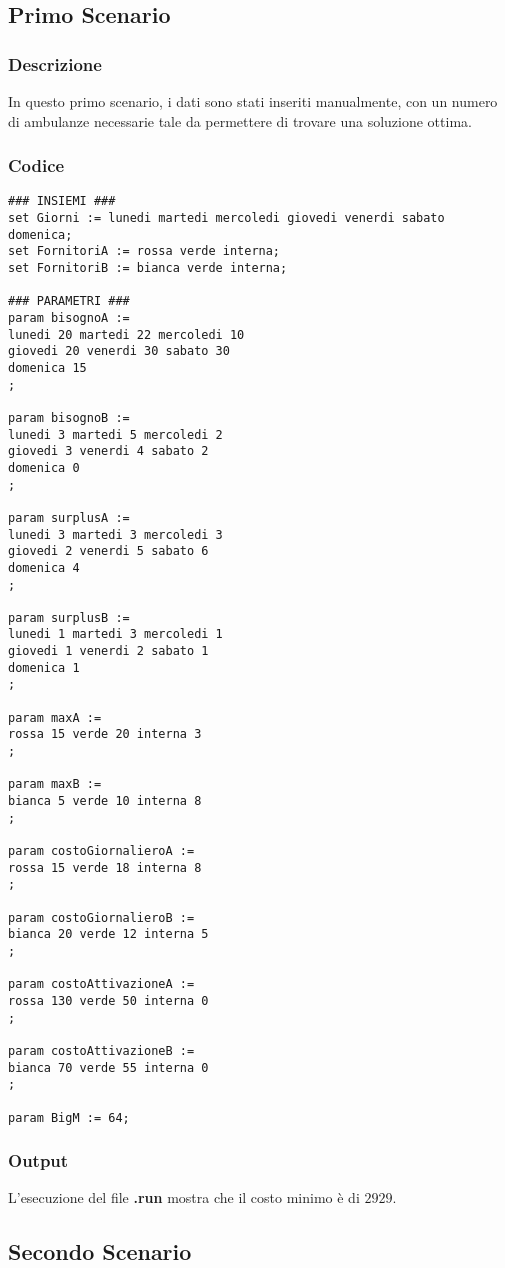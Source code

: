 \subsection{Primo Scenario}
\subsubsection{Descrizione}
In questo primo scenario, i dati sono stati inseriti manualmente, con un numero di ambulanze necessarie tale da permettere di trovare una soluzione ottima.
\subsubsection{Codice}
\begin{lstlisting}
### INSIEMI ###
set Giorni := lunedi martedi mercoledi giovedi venerdi sabato domenica;
set FornitoriA := rossa verde interna;
set FornitoriB := bianca verde interna;

### PARAMETRI ###
param bisognoA := 
lunedi 20 martedi 22 mercoledi 10 
giovedi 20 venerdi 30 sabato 30
domenica 15
;

param bisognoB := 
lunedi 3 martedi 5 mercoledi 2
giovedi 3 venerdi 4 sabato 2
domenica 0
;

param surplusA :=
lunedi 3 martedi 3 mercoledi 3
giovedi 2 venerdi 5 sabato 6
domenica 4
;

param surplusB :=
lunedi 1 martedi 3 mercoledi 1
giovedi 1 venerdi 2 sabato 1
domenica 1
;

param maxA :=
rossa 15 verde 20 interna 3
;

param maxB :=
bianca 5 verde 10 interna 8
;

param costoGiornalieroA :=
rossa 15 verde 18 interna 8
;

param costoGiornalieroB :=
bianca 20 verde 12 interna 5
;

param costoAttivazioneA :=
rossa 130 verde 50 interna 0
;

param costoAttivazioneB :=
bianca 70 verde 55 interna 0
; 

param BigM := 64;
\end{lstlisting}
\subsubsection{Output}
L'esecuzione del file \textbf{.run} mostra che il costo minimo è di \texteuro $2929$.

\subsection{Secondo Scenario}
